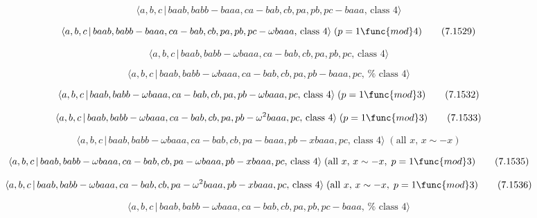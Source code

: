 \documentclass[10pt]{article}
\begin{document}
\begin{equation}
\langle a,b,c\,|\,baab,babb-baaa,ca-bab,cb,pa,pb,pc-baaa,\,\text{class }%
4\rangle  \tag{7.1528}
\end{equation}

\begin{equation}
\langle a,b,c\,|\,baab,babb-baaa,ca-bab,cb,pa,pb,pc-\omega baaa,\,\text{%
class }4\rangle \;(p=1\func{mod}4)  \tag{7.1529}
\end{equation}

\begin{equation}
\langle a,b,c\,|\,baab,babb-\omega baaa,ca-bab,cb,pa,pb,pc,\,\text{class }%
4\rangle  \tag{7.1530}
\end{equation}

\begin{equation}
\langle a,b,c\,|\,baab,babb-\omega baaa,ca-bab,cb,pa,pb-baaa,pc,\,\text{%
class }4\rangle  \tag{7.1531}
\end{equation}

\begin{equation}
\langle a,b,c\,|\,baab,babb-\omega baaa,ca-bab,cb,pa,pb-\omega baaa,pc,\,%
\text{class }4\rangle \;(p=1\func{mod}3)  \tag{7.1532}
\end{equation}

\begin{equation}
\langle a,b,c\,|\,baab,babb-\omega baaa,ca-bab,cb,pa,pb-\omega ^{2}baaa,pc,\,%
\text{class }4\rangle \;(p=1\func{mod}3)  \tag{7.1533}
\end{equation}

\begin{equation}
\langle a,b,c\,|\,baab,babb-\omega baaa,ca-bab,cb,pa-baaa,pb-xbaaa,pc,\,%
\text{class }4\rangle \;(\text{all }x,\,x\sim -x)  \tag{7.1534}
\end{equation}

\begin{equation}
\langle a,b,c\,|\,baab,babb-\omega baaa,ca-bab,cb,pa-\omega
baaa,pb-xbaaa,pc,\,\text{class }4\rangle \;(\text{all }x,\,x\sim -x,\;p=1%
\func{mod}3)  \tag{7.1535}
\end{equation}

\begin{equation}
\langle a,b,c\,|\,baab,babb-\omega baaa,ca-bab,cb,pa-\omega
^{2}baaa,pb-xbaaa,pc,\,\text{class }4\rangle \;(\text{all }x,\,x\sim -x,\;p=1%
\func{mod}3)  \tag{7.1536}
\end{equation}

\begin{equation}
\langle a,b,c\,|\,baab,babb-\omega baaa,ca-bab,cb,pa,pb,pc-baaa,\,\text{%
class }4\rangle  \tag{7.1537}
\end{equation}
\end{document}
